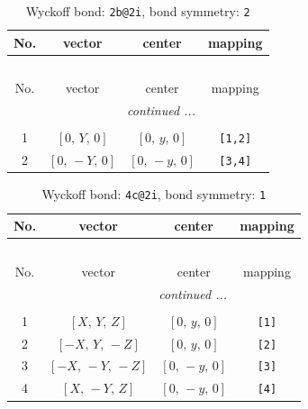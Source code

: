 \documentclass[fleqn,8pt]{jsarticle}
\begin{document}
\begin{longtable}{cccc}
\caption{Wyckoff bond: {\tt 2b@2i}, bond symmetry: {\tt 2}}
 \\
 \hline \hline
No. & vector & center & mapping \\ \hline \endfirsthead

\multicolumn{3}{l}{\tablename\ \thetable{}} \\
 \hline \hline
No. & vector & center & mapping \\ \hline \endhead

 \hline \hline
\multicolumn{3}{r}{\footnotesize\it continued ...} \\ \endfoot

 \hline \hline
\multicolumn{3}{r}{} \\ \endlastfoot

1 & $\left[ 0,\, Y,\, 0 \right]$ & $\left[ 0,\, y,\, 0 \right]$ & {\tt [1,2]} \\ \hline
2 & $\left[ 0,\, - Y,\, 0 \right]$ & $\left[ 0,\, - y,\, 0 \right]$ & {\tt [3,4]} \\
\end{longtable}
\renewcommand{\arraystretch}{1.2}
\begin{longtable}{cccc}
\caption{Wyckoff bond: {\tt 4c@2i}, bond symmetry: {\tt 1}}
 \\
 \hline \hline
No. & vector & center & mapping \\ \hline \endfirsthead

\multicolumn{3}{l}{\tablename\ \thetable{}} \\
 \hline \hline
No. & vector & center & mapping \\ \hline \endhead

 \hline \hline
\multicolumn{3}{r}{\footnotesize\it continued ...} \\ \endfoot

 \hline \hline
\multicolumn{3}{r}{} \\ \endlastfoot

1 & $\left[ X,\, Y,\, Z \right]$ & $\left[ 0,\, y,\, 0 \right]$ & {\tt [1]} \\ \hline
2 & $\left[ - X,\, Y,\, - Z \right]$ & $\left[ 0,\, y,\, 0 \right]$ & {\tt [2]} \\ \hline
3 & $\left[ - X,\, - Y,\, - Z \right]$ & $\left[ 0,\, - y,\, 0 \right]$ & {\tt [3]} \\ \hline
4 & $\left[ X,\, - Y,\, Z \right]$ & $\left[ 0,\, - y,\, 0 \right]$ & {\tt [4]} \\
\end{longtable}
\end{document}
